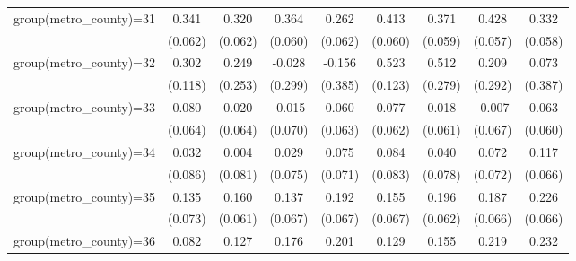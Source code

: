 {\begin{tabular}{l*{8}{c}}
group(metro\_county)=31&       0.341\sym{***}&       0.320\sym{***}&       0.364\sym{***}&       0.262\sym{***}&       0.413\sym{***}&       0.371\sym{***}&       0.428\sym{***}&       0.332\sym{***}\\
                    &     (0.062)         &     (0.062)         &     (0.060)         &     (0.062)         &     (0.060)         &     (0.059)         &     (0.057)         &     (0.058)         \\
group(metro\_county)=32&       0.302\sym{**} &       0.249         &      -0.028         &      -0.156         &       0.523\sym{***}&       0.512\sym{*}  &       0.209         &       0.073         \\
                    &     (0.118)         &     (0.253)         &     (0.299)         &     (0.385)         &     (0.123)         &     (0.279)         &     (0.292)         &     (0.387)         \\
group(metro\_county)=33&       0.080         &       0.020         &      -0.015         &       0.060         &       0.077         &       0.018         &      -0.007         &       0.063         \\
                    &     (0.064)         &     (0.064)         &     (0.070)         &     (0.063)         &     (0.062)         &     (0.061)         &     (0.067)         &     (0.060)         \\
group(metro\_county)=34&       0.032         &       0.004         &       0.029         &       0.075         &       0.084         &       0.040         &       0.072         &       0.117\sym{*}  \\
                    &     (0.086)         &     (0.081)         &     (0.075)         &     (0.071)         &     (0.083)         &     (0.078)         &     (0.072)         &     (0.066)         \\
group(metro\_county)=35&       0.135\sym{*}  &       0.160\sym{**} &       0.137\sym{**} &       0.192\sym{***}&       0.155\sym{**} &       0.196\sym{***}&       0.187\sym{***}&       0.226\sym{***}\\
                    &     (0.073)         &     (0.061)         &     (0.067)         &     (0.067)         &     (0.067)         &     (0.062)         &     (0.066)         &     (0.066)         \\
group(metro\_county)=36&       0.082         &       0.127\sym{**} &       0.176\sym{***}&       0.201\sym{***}&       0.129\sym{**} &       0.155\sym{***}&       0.219\sym{***}&       0.232\sym{***}\\

\end{tabular}}
